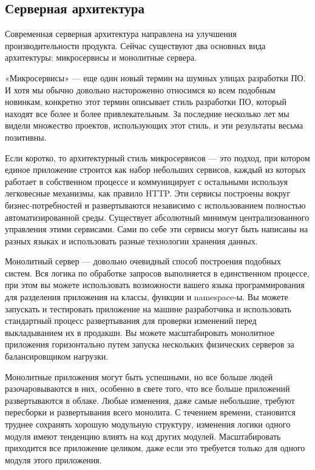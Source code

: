 \subsection{Серверная архитектура}
\label{sec:analysis:serv_arch}

Современная серверная архитектура направлена на улучшения производительности продукта. Сейчас существуют два основных вида архитектуры: микросервисы и монолитные сервера.

«Микросервисы» — еще один новый термин на шумных улицах разработки ПО. И хотя мы обычно довольно настороженно относимся ко всем подобным новинкам, конкретно этот термин описывает стиль разработки ПО, который находят все более и более привлекательным. За последние несколько лет мы видели множество проектов, использующих этот стиль, и эти результаты весьма позитивны.

Если коротко, то архитектурный стиль микросервисов — это подход, при котором единое приложение строится как набор небольших сервисов, каждый из которых работает в собственном процессе и коммуницирует с остальными используя легковесные механизмы, как правило HTTP. Эти сервисы построены вокруг бизнес-потребностей и развертываются независимо с использованием полностью автоматизированной среды. Существует абсолютный минимум централизованного управления этими сервисами. Сами по себе эти сервисы могут быть написаны на разных языках и использовать разные технологии хранения данных.

Монолитный сервер — довольно очевидный способ построения подобных систем. Вся логика по обработке запросов выполняется в единственном процессе, при этом вы можете использовать возможности вашего языка программирования для разделения приложения на классы, функции и namespace-ы. Вы можете запускать и тестировать приложение на машине разработчика и использовать стандартный процесс развертывания для проверки изменений перед выкладыванием их в продакшн. Вы можете масштабировать монолитное приложения горизонтально путем запуска нескольких физических серверов за балансировщиком нагрузки.

Монолитные приложения могут быть успешными, но все больше людей разочаровываются в них, особенно в свете того, что все больше приложений развертываются в облаке. Любые изменения, даже самые небольшие, требуют пересборки и развертывания всего монолита. С течением времени, становится труднее сохранять хорошую модульную структуру, изменения логики одного модуля имеют тенденцию влиять на код других модулей. Масштабировать приходится все приложение целиком, даже если это требуется только для одного модуля этого приложения.
